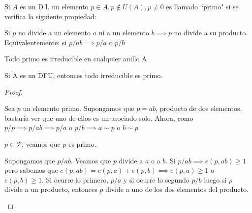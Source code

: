\begin{ndef}
	Si $A$ es un D.I. un elemento $p\in A , p \notin U(A), p \ne 0$ es llamado “primo" si se verifica la siguiente propiedad:

	Si $p$ no divide a un elemento $a$ ni a un elemento $b \implies p$ no divide a su producto.\\
	Equivalentemente: si $p/ab \implies p/a$ o $p/b$

\end{ndef}

\begin{nprop}
\begin{nlist}
	\item Todo primo es irreducible en cualquier anillo A
	\item Si A es un DFU, entonces todo irreducible es primo.
\end{nlist}
\end{nprop}
\begin{proof}
	\begin{nlist}
	\item Sea $p$ un elemento primo. Supongamos que $p=ab$, producto de dos elementos, bastaría ver que uno de ellos es un asociado solo. Ahora, como $p/p \implies p/ab \implies  p/a $ o $p/b \implies a \sim p$ o $b \sim p$

	\item $p \in \mathcal{P}$, veamos que $p$ es primo.

Supongamos que $p/ab$. Veamos que $p$ divide a $a$ o a $b$.
Si $p/ab\implies e(p,ab) \geq 1$ pero sabemos que $e(p,ab) = e(p,a)+e(p,b) \implies e(p,a) \geq 1$ o $e(p,b) \geq 1$. Si ocurre lo primero, $p/a$ y si ocurre lo segundo $p/b$ luego si $p$ divide a un producto, entonces $p$ divide a uno de los dos elementos del producto.
\end{nlist}
\end{proof}



